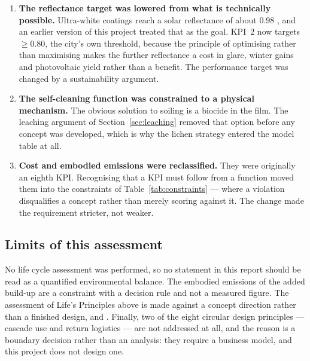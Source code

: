 \begin{enumerate}
  \item \textbf{The reflectance target was lowered from what is technically
        possible.} Ultra-white coatings reach a solar reflectance of about
        $0.98$ \parencite{li2021}, and an earlier version of this project treated
        that as the goal. KPI~2 now targets $\geq0.80$, the city's own threshold,
        because the principle of optimising rather than maximising makes the
        further reflectance a cost in glare, winter gains and photovoltaic yield
        rather than a benefit. The performance target was changed by a
        sustainability argument.
  \item \textbf{The self-cleaning function was constrained to a physical
        mechanism.} The obvious solution to soiling is a biocide in the film. The
        leaching argument of Section~\ref{sec:leaching} removed that option
        before any concept was developed, which is why the lichen strategy
        entered the model table at all.
  \item \textbf{Cost and embodied emissions were reclassified.} They were
        originally an eighth KPI. Recognising that a KPI must follow from a
        function moved them into the constraints of
        Table~\ref{tab:constraints} --- where a violation disqualifies a concept
        rather than merely scoring against it. The change made the requirement
        stricter, not weaker.
\end{enumerate}

\subsection{Limits of this assessment}

No life cycle assessment was performed, so no statement in this report should be
read as a quantified environmental balance. The embodied emissions of the added
build-up are a constraint with a decision rule and not a measured figure. The
assessment of Life's Principles above is made against a concept direction rather
than a finished design, and . Finally, two of the eight circular
design principles --- cascade use and return logistics --- are not addressed at
all, and the reason is a boundary decision rather than an analysis: they require
a business model, and this project does not design one.
